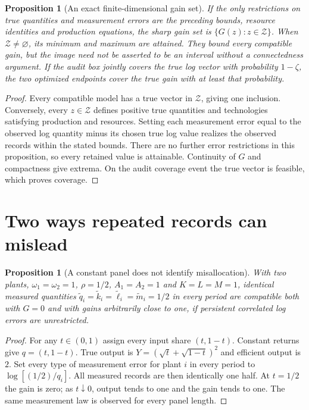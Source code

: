 \documentclass[11pt]{article}
\newtheorem{proposition}[theorem]{Proposition}
\theoremstyle{remark}\newtheorem{remark}[theorem]{Remark}
\begin{document}
\begin{proposition}[An exact finite-dimensional gain set]
If the only restrictions on true quantities and measurement errors are the preceding bounds, resource identities and production equations, the sharp gain set is
$\{G(z):z\in\mathcal Z\}$. When $\mathcal Z\neq\varnothing$, its minimum and maximum are attained. They bound every compatible gain, but the image need not be asserted to be an interval without a connectedness argument. If the audit box jointly covers the true log vector with probability $1-\zeta$, the two optimized endpoints cover the true gain with at least that probability.
\end{proposition}
\begin{proof}
Every compatible model has a true vector in $\mathcal Z$, giving one inclusion. Conversely, every $z\in\mathcal Z$ defines positive true quantities and technologies satisfying production and resources. Setting each measurement error equal to the observed log quantity minus its chosen true log value realizes the observed records within the stated bounds. There are no further error restrictions in this proposition, so every retained value is attainable. Continuity of $G$ and compactness give extrema. On the audit coverage event the true vector is feasible, which proves coverage.
\end{proof}

\section{Two ways repeated records can mislead}
\begin{proposition}[A constant panel does not identify misallocation]
With two plants, $\omega_1=\omega_2=1$, $\rho=1/2$, $A_1=A_2=1$ and $K=L=M=1$, identical measured quantities $\widetilde q_i=\widetilde k_i=\widetilde\ell_i=\widetilde m_i=1/2$ in every period are compatible both with $G=0$ and with gains arbitrarily close to one, if persistent correlated log errors are unrestricted.
\end{proposition}
\begin{proof}
For any $t\in(0,1)$ assign every input share $(t,1-t)$. Constant returns give $q=(t,1-t)$. True output is
$Y=(\sqrt t+\sqrt{1-t})^2$ and efficient output is $2$. Set every type of measurement error for plant $i$ in every period to $\log[(1/2)/q_i]$. All measured records are then identically one half. At $t=1/2$ the gain is zero; as $t\downarrow0$, output tends to one and the gain tends to one. The same measurement law is observed for every panel length.
\end{proof}
\end{document}
